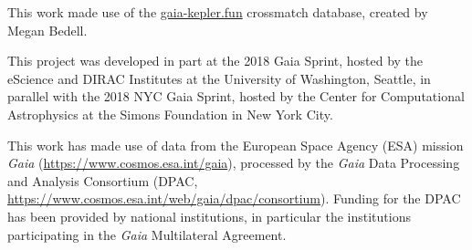\documentclass[preprint2]{aastex62}
\begin{document}
This work made use of the \url{gaia-kepler.fun} crossmatch database, created by Megan Bedell.

This project was developed in part at the 2018 Gaia Sprint, hosted by the eScience and DIRAC Institutes at the University of Washington, Seattle, in parallel with the 2018 NYC Gaia Sprint, hosted by the Center for Computational Astrophysics at the Simons Foundation in New York City.

This work has made use of data from the European Space Agency (ESA) mission
{\it Gaia} (\url{https://www.cosmos.esa.int/gaia}), processed by the {\it Gaia}
Data Processing and Analysis Consortium (DPAC,
\url{https://www.cosmos.esa.int/web/gaia/dpac/consortium}). Funding for the DPAC
has been provided by national institutions, in particular the institutions
participating in the {\it Gaia} Multilateral Agreement.





%
\end{document}
